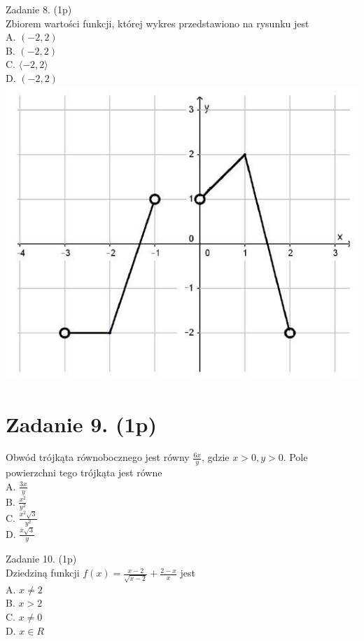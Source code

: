 \documentclass[10pt]{article}
\begin{document}
Zadanie 8. (1p)\\
Zbiorem wartości funkcji, której wykres przedstawiono na rysunku jest\\
A. \((-2,2)\)\\
B. \((-2,2)\)\\
C. \(\langle-2,2\rangle\)\\
D. \((-2,2)\)\\
\includegraphics[max width=\textwidth, center]{2024_11_21_b63ac6eb3d78a57ac924g-04(1)}

\section*{Zadanie 9. (1p)}
Obwód trójkąta równobocznego jest równy \(\frac{6 x}{y}\), gdzie \(x>0, y>0\). Pole powierzchni tego trójkąta jest równe\\
A. \(\frac{3 x}{y}\)\\
B. \(\frac{x^{2}}{y^{2}}\)\\
C. \(\frac{x^{2} \sqrt{3}}{y^{2}}\)\\
D. \(\frac{x \sqrt{3}}{y}\)

Zadanie 10. (1p)\\
Dziedziną funkcji \(f(x)=\frac{x-2}{\sqrt{x-2}}+\frac{2-x}{x}\) jest\\
A. \(x \neq 2\)\\
B. \(x>2\)\\
C. \(x \neq 0\)\\
D. \(x \in R\)
\end{document}
